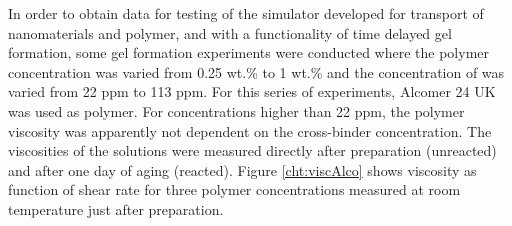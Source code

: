\documentclass[nanomaterials,article,submit,moreauthors,pdftex]{Definitions/mdpi}
\begin{document}
In order to obtain data for testing of the simulator developed for transport of nanomaterials and polymer, and with a functionality of time delayed gel formation, some gel formation experiments were conducted where the polymer concentration was varied from 0.25 wt.\% to 1 wt.\% and the concentration of  was varied from 22 ppm to 113 ppm. For this series of experiments, Alcomer 24 UK was used as polymer. For concentrations higher than 22 ppm, the polymer viscosity was apparently not dependent on the cross-binder concentration. The viscosities of the solutions were measured directly after preparation (unreacted) and after one day of aging (reacted). Figure \ref{cht:viscAlco} shows viscosity as function of shear rate for three polymer concentrations measured at room temperature just after preparation.
\end{document}
